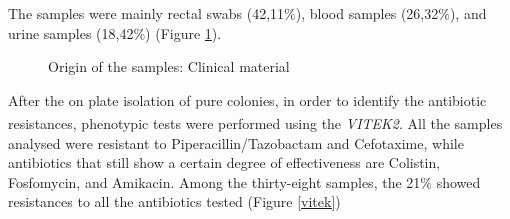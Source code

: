 \documentclass[11pt]{report}
\begin{document}
The samples were mainly rectal swabs (42,11$\%$), blood samples (26,32$\%$), and urine samples (18,42$\%$) (Figure \ref{clinical_mat}).

\begin{figure}[h!]
\centering
{}
\caption{Origin of the samples: Clinical material}
\label{clinical_mat}
\end{figure}

\clearpage

After the on plate isolation of pure colonies, in order to identify the antibiotic resistances, phenotypic tests were performed using the \emph{VITEK}\textsuperscript{\textregistered}\emph{2}.
All the samples analysed were resistant to Piperacillin/Tazobactam and Cefotaxime, while antibiotics that still show a certain degree of effectiveness are Colistin, Fosfomycin, and Amikacin.
Among the thirty-eight samples, the 21$\%$ showed resistances to all the antibiotics tested (Figure \ref{vitek})
\end{document}
